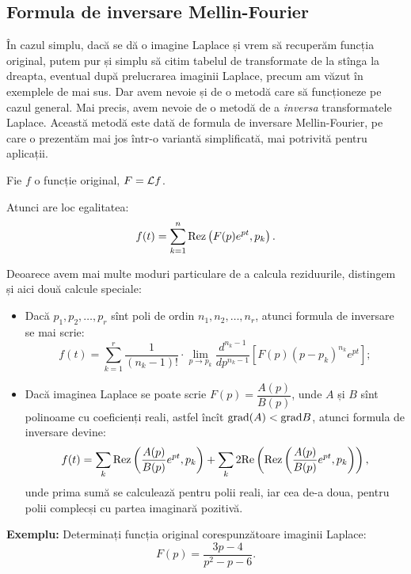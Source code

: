 \subsection{Formula de inversare Mellin-Fourier}

În cazul simplu, dacă se dă o imagine Laplace și vrem să recuperăm funcția
original, putem pur și simplu să citim tabelul de transformate de la stînga
la dreapta, eventual după prelucrarea imaginii Laplace, precum am văzut în
exemplele de mai sus. Dar avem nevoie și de o metodă care să funcționeze 
pe cazul general. Mai precis, avem nevoie de o metodă de a \emph{inversa}
transformatele Laplace. Această metodă este dată de formula de inversare
Mellin-Fourier, pe care o prezentăm mai jos într-o variantă simplificată,
mai potrivită pentru aplicații.

\begin{theorem}\label{thm:mellin-fourier}
  Fie $ f $ o funcție original, $ F = \mathcal{L} f $.

  Atunci are loc egalitatea:
  \[
    f(t) = \sum_{k=1}^n \mathrm{Rez}\left(F(p)e^{pt}, p_k\right).
  \]
\end{theorem}

Deoarece avem mai multe moduri particulare de a calcula reziduurile, distingem
și aici două calcule speciale:
\begin{itemize}
\item Dacă $ p_1, p_2, \dots, p_r $ sînt poli de ordin $ n_1, n_2, \dots, n_r $, atunci
  formula de inversare se mai scrie:
  \[
    f(t) = \sum_{k=1}^r \dfrac{1}{(n_k - 1)!} \cdot %
    \lim_{p \to p_k} \dfrac{d^{n_k - 1}}{dp^{n_k - 1}} \left[ %
      F(p)(p - p_k)^{n_k} e^{pt} \right];
  \]
\item Dacă imaginea Laplace se poate scrie $ F(p) = \dfrac{A(p)}{B(p)} $,
  unde $ A $ și $ B $ sînt polinoame cu coeficienți reali, astfel încît
  $ \mathrm{grad}(A) < \mathrm{grad}B $, atunci formula de inversare devine:
  \[
    f(t) = \sum_k \Rez\left(\dfrac{A(p)}{B(p)}e^{pt}, p_k\right) + %
    \sum_k 2 \dr{Re} \left( \Rez \left( \dfrac{A(p)}{B(p)}e^{pt}, p_k \right) \right),
  \]
  unde prima sumă se calculează pentru polii reali, iar cea de-a doua, pentru
  polii complecși cu partea imaginară pozitivă.
\end{itemize}

\textbf{Exemplu:} Determinați funcția original corespunzătoare imaginii
Laplace:
\[
  F(p) = \dfrac{3p - 4}{p^2 - p - 6}.
\]

